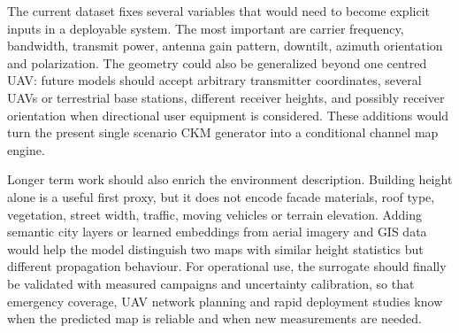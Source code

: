 The current dataset fixes several variables that would need to become explicit
inputs in a deployable system. The most important are carrier frequency,
bandwidth, transmit power, antenna gain pattern, downtilt, azimuth orientation
and polarization. The geometry could also be generalized beyond one centred UAV:
future models should accept arbitrary transmitter coordinates, several UAVs or
terrestrial base stations, different receiver heights, and possibly receiver
orientation when directional user equipment is considered. These additions
would turn the present single scenario CKM generator into a conditional channel
map engine.

Longer term work should also enrich the environment description. Building
height alone is a useful first proxy, but it does not encode facade materials,
roof type, vegetation, street width, traffic, moving vehicles or terrain
elevation. Adding semantic city layers or learned embeddings from aerial
imagery and GIS data would help the model distinguish two maps with similar
height statistics but different propagation behaviour. For operational use, the
surrogate should finally be validated with measured campaigns and uncertainty
calibration, so that emergency coverage, UAV network planning and rapid
deployment studies know when the predicted map is reliable and when new
measurements are needed.
